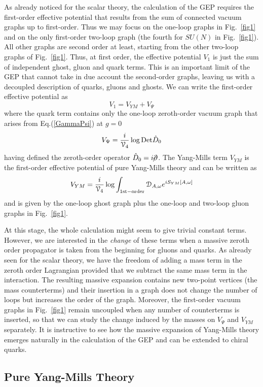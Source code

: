\documentclass[aps,preprint]{revtex4}
\newcommand{\BE}{\begin{equation}}
\newcommand{\EE}{\end{equation}}
\newcommand{\fsl}[1]{\ensuremath{\mathrlap{\!\not{\phantom{#1}}}#1}}
\begin{document}
As already noticed for the scalar theory, the calculation of the GEP requires the first-order effective potential
that results from the sum of connected vacuum graphs up to first-order. Thus we may focus on the one-loop
graphs in Fig.~\ref{fig1} and on the only first-order two-loop graph (the fourth for $SU(N)$ in Fig.~\ref{fig1}). 
All other graphs are
second order at least, starting from the other two-loop graphs of Fig.~\ref{fig1}.
Thus, at first order, the effective potential $V_1$ is just the sum of independent ghost, gluon and quark terms.
This is an important limit of the GEP that cannot take in due account the second-order graphs, leaving us with
a decoupled description of quarks, gluons and ghosts. 
We can write the first-order effective potential as
\BE
V_1=V_{YM}+V_\Psi
\EE
where the quark term contains only the one-loop zeroth-order vacuum graph that arises from Eq.(\ref{GammaPsi})
at $g=0$
\BE
V_\Psi=\frac{i}{{\cal V}_4} \log {\rm Det} \hat D_0
\label{VPsi}
\EE
having defined the zeroth-order operator $\hat D_0=i\fsl{\partial}$.
The Yang-Mills term $V_{YM}$ is the first-order effective potential of pure Yang-Mills theory 
and can be written as
\BE
V_{YM}=\frac{i}{{\cal V}_4} \log \int_{\rm 1st-order} {\cal D}_{ A, \omega} e^{i S_{YM} [A, \omega]}
\label{VYM}
\EE
and is given by the one-loop ghost graph plus the one-loop and two-loop gluon graphs in Fig.~\ref{fig1}.

At this stage, the whole calculation might seem to give trivial constant terms. 
However, we are interested in the {\it change} of these terms when a massive zeroth order propagator is
taken from the beginning for gluons and quarks. As already seen for the scalar theory, we have the freedom of
adding a mass term in the zeroth order Lagrangian provided that we subtract the same mass term in
the interaction. The resulting massive expansion contains new two-point vertices (the mass counterterms)
and their insertion in a graph does not change the number of loops but increases the order of the graph.
Moreover, the first-order vacuum graphs in Fig.~\ref{fig1} remain uncoupled when any number of counterterms is inserted,
so that we can study the change induced by the masses on $V_\Psi$ and $V_{YM}$ separately. It is
instructive to see how the massive expansion\cite{ptqcd,ptqcd2} of Yang-Mills theory emerges naturally 
in the calculation of the GEP and can be extended to chiral quarks.



\subsection{Pure Yang-Mills Theory}\label{sec41}
\end{document}
